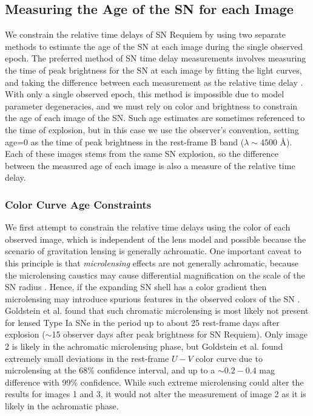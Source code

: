 \documentclass[12pt,dvipsnames]{article}
\def\SNABC{SN Requiem\xspace}
\begin{document}
\subsection*{Measuring the Age of the SN for each Image}
We constrain the relative time delays of \SNABC by using two separate methods to estimate the age of the SN at each image during the single observed epoch. The preferred method of SN time delay measurements involves measuring the time of peak brightness for the SN at each image by fitting the light curves, and taking the difference between each measurement as the relative time delay \cite{pierel_turning_2019,dhawan_magnification_2019,huber_strongly_2019}. With only a single observed epoch, this method is impossible due to model parameter degeneracies, and we must rely on color and brightness to constrain the age of each image of the SN. Such age estimates are sometimes referenced to the time of explosion, but in this case we use the observer's convention, setting age=0 as the time of peak brightness in the rest-frame B band ($\lambda\sim4500$ \AA).  Each of these images stems from the same SN explosion, so the difference between the measured age of each image is also a measure of the relative time delay. 

\subsubsection*{Color Curve Age Constraints}

We first attempt to constrain the relative time delays using the color of each observed image, which is independent of the lens model and possible because the scenario of gravitation lensing is generally achromatic. One important caveat to this principle is that {\it microlensing} effects are not generally achromatic, because the microlensing caustics may cause differential magnification on the scale of the SN radius \cite{goldstein_precise_2018,foxley-marrable_impact_2018,bonvin_impact_2019}.  Hence, if the expanding SN shell has a color gradient then microlensing may introduce spurious features in the observed colors of the SN \cite{kochanek_quantitative_2004,vernardos_joint_2018}.   Goldstein et al. \cite{goldstein_precise_2018} found that such chromatic microlensing is most likely not present for lensed Type Ia SNe in the period up to about 25 rest-frame days after explosion ($\sim$15 observer days after peak brightness for \SNABC). Only image 2 is likely in the achromatic microlensing phase, but Goldstein et al. \cite{goldstein_precise_2018} found extremely small deviations in the rest-frame $U-V$ color curve due to microlensing at the 68\% confidence interval, and up to a $\sim0.2-0.4$ mag difference with 99\% confidence. While such extreme microlensing could alter the results for images 1 and 3, it would not alter the measurement of image 2 as it is likely in the achromatic phase.
\end{document}
